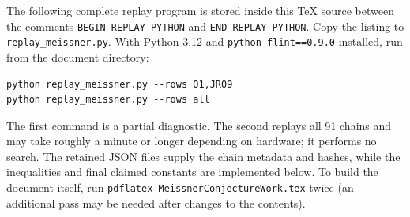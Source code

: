 \documentclass[11pt]{article}
\theoremstyle{remark}\newtheorem{remark}[theorem]{Remark}
\begin{document}
The following complete replay program is stored inside this TeX source between the comments \texttt{BEGIN REPLAY PYTHON} and \texttt{END REPLAY PYTHON}. Copy the listing to \texttt{replay\_meissner.py}. With Python 3.12 and \texttt{python-flint==0.9.0} installed, run from the document directory:
\begin{verbatim}
python replay_meissner.py --rows O1,JR09
python replay_meissner.py --rows all
\end{verbatim}
The first command is a partial diagnostic. The second replays all 91 chains and may take roughly a minute or longer depending on hardware; it performs no search. The retained JSON files supply the chain metadata and hashes, while the inequalities and final claimed constants are implemented below. To build the document itself, run \texttt{pdflatex MeissnerConjectureWork.tex} twice (an additional pass may be needed after changes to the contents).
\end{document}

